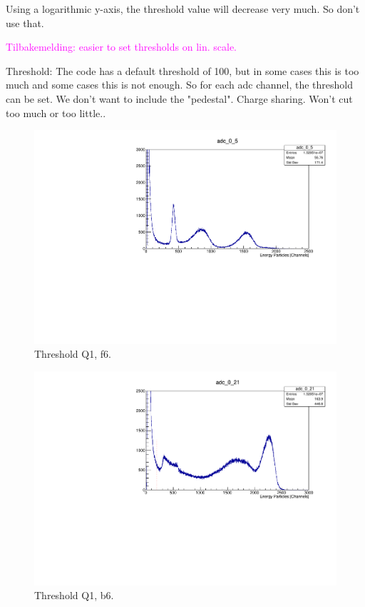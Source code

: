 \documentclass[twoside,english]{uiofysmaster/uiofysmaster}
\begin{document}
Using a logarithmic y-axis, the threshold value will decrease very much. So don't use that. 

\textcolor{Magenta}{Tilbakemelding: \newline 
easier to set thresholds on lin. scale.
}

Threshold: The code has a default threshold of 100, but in some cases this is too much and some cases this is not enough. So for each adc channel, the threshold can be set. We don't want to include the "pedestal". Charge sharing.
Won't cut too much or too little..

\begin{figure}[ht]
	\centering
	\includegraphics[width=\textwidth]{../Plots/plotting/Threshold_Q1_f6.pdf}
	\caption{Threshold Q1, f6.}
	\label{fig:Threshold_f}
\end{figure}


\begin{figure}[ht]
	\centering
	\includegraphics[width=\textwidth]{../Plots/plotting/Threshold_Q1_b6.pdf}
	\caption{Threshold Q1, b6.}
	\label{fig:Threshold_b}
\end{figure}
\end{document}
